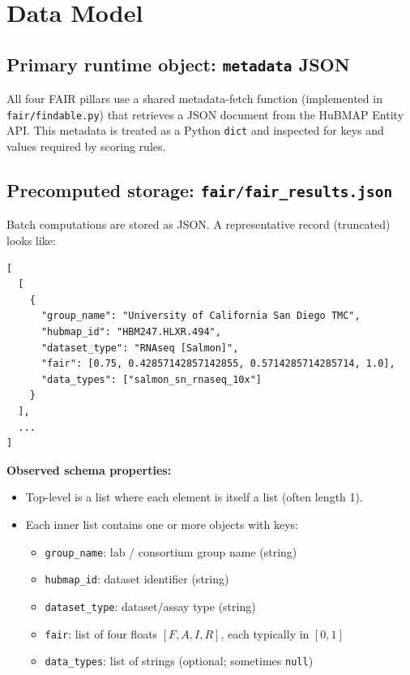\documentclass[11pt]{article}
\begin{document}
\section{Data Model}
\subsection{Primary runtime object: \texttt{metadata} JSON}
All four FAIR pillars use a shared metadata-fetch function (implemented in \texttt{fair/findable.py}) that retrieves a JSON document from the HuBMAP Entity API. This metadata is treated as a Python \texttt{dict} and inspected for keys and values required by scoring rules.

\subsection{Precomputed storage: \texttt{fair/fair\_results.json}}
Batch computations are stored as JSON. A representative record (truncated) looks like:

\begin{lstlisting}[style=xml,caption={Representative structure of \texttt{fair/fair\_results.json} (schema illustration).}]
[
  [
    {
      "group_name": "University of California San Diego TMC",
      "hubmap_id": "HBM247.HLXR.494",
      "dataset_type": "RNAseq [Salmon]",
      "fair": [0.75, 0.42857142857142855, 0.5714285714285714, 1.0],
      "data_types": ["salmon_sn_rnaseq_10x"]
    }
  ],
  ...
]
\end{lstlisting}

\noindent\textbf{Observed schema properties:}
\begin{itemize}[leftmargin=2em]
  \item Top-level is a list where each element is itself a list (often length 1).
  \item Each inner list contains one or more objects with keys:
    \begin{itemize}
      \item \texttt{group\_name}: lab / consortium group name (string)
      \item \texttt{hubmap\_id}: dataset identifier (string)
      \item \texttt{dataset\_type}: dataset/assay type (string)
      \item \texttt{fair}: list of four floats \([F, A, I, R]\), each typically in \([0, 1]\)
      \item \texttt{data\_types}: list of strings (optional; sometimes \texttt{null})
    \end{itemize}
\end{itemize}
\end{document}
